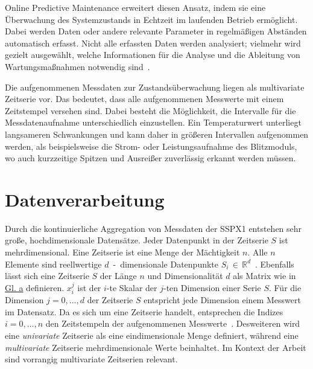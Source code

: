 Online Predictive Maintenance erweitert diesen Ansatz, indem sie eine Überwachung des Systemzustands in Echtzeit im laufenden Betrieb
ermöglicht. Dabei werden Daten oder andere relevante Parameter in regelmäßigen Abständen automatisch erfasst. Nicht alle erfassten
Daten werden analysiert; vielmehr wird gezielt ausgewählt, welche Informationen für die Analyse und die Ableitung von Wartungsmaßnahmen
notwendig sind~\cite{Lindstroem2017}. 

Die aufgenommenen Messdaten zur Zustandsüberwachung liegen als multivariate Zeitserie vor. Das bedeutet, dass alle aufgenommenen Messwerte
mit einem Zeitstempel versehen sind. Dabei besteht die Möglichkeit, die Intervalle für die Messdatenaufnahme unterschiedlich einzustellen.
Ein Temperaturwert unterliegt langsameren Schwankungen und kann daher in größeren Intervallen aufgenommen werden, als beispielsweise die
Strom- oder Leistungsaufnahme des Blitzmoduls, wo auch kurzzeitige Spitzen und Ausreißer zuverlässig erkannt werden müssen.

\newpage
\section{Datenverarbeitung}\label{sec:datenverarbeitung}
Durch die kontinuierliche Aggregation von Messdaten der SSPX1 entstehen sehr große, hochdimensionale Datensätze. Jeder Datenpunkt in
der Zeitserie $S$ ist mehrdimensional. Eine Zeitserie ist eine Menge der Mächtigkeit $n$. Alle $n$ Elemente sind reellwertige
$d$~-~dimensionale Datenpunkte $S_i\,\in\,\mathbb{R}^{d}$~\cite{Schmidl2022}. Ebenfalls lässt sich eine Zeitserie $S$ der Länge $n$ und
Dimensionalität $d$ als Matrix wie in \hyperref[eq:timeseries_matrix_sum]{Gl. a} definieren. $x_{i}^{j}$ ist
der $i$-te Skalar der $j$-ten Dimension einer Serie $S$. Für die Dimension $j={0,\dots,d}$ der Zeitserie $S$ entspricht jede Dimension
einem Messwert im Datensatz. Da es sich um eine Zeitserie handelt, entsprechen die Indizes $i={0, \dots, n}$ den Zeitstempeln der
aufgenommenen Messwerte~\cite{Wenig2024}. Desweiteren wird eine \textit{univariate} Zeitserie als eine eindimensionale Menge definiert,
während eine \textit{multivariate} Zeitserie mehrdimensionale Werte beinhaltet. Im Kontext der Arbeit sind vorrangig multivariate
Zeitserien relevant.

